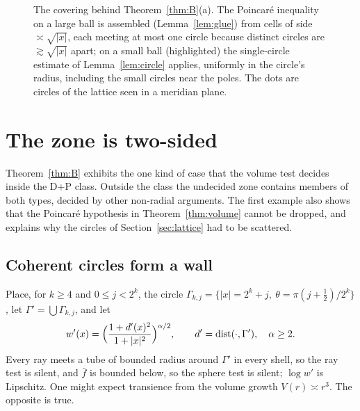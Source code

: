 \documentclass[11pt]{amsart}
\newcommand{\abs}[1]{\lvert #1\rvert}
\newcommand{\fbar}{\bar f}
\DeclareMathOperator{\dist}{dist}
\theoremstyle{plain}
\theoremstyle{definition}
\theoremstyle{remark}
\begin{document}
\begin{figure}[t]
\centering
{}
\caption{The covering behind Theorem~\ref{thm:B}(a). The Poincar\'e inequality on
a large ball is assembled (Lemma~\ref{lem:glue}) from cells of side
$\asymp\sqrt{\abs x}$, each meeting at most one circle because distinct circles
are $\gtrsim\sqrt{\abs x}$ apart; on a small ball (highlighted) the single-circle
estimate of Lemma~\ref{lem:circle} applies, uniformly in the circle's radius,
including the small circles near the poles. The dots are circles of the lattice
seen in a meridian plane.}
\label{fig:covering}
\end{figure}

\section{The zone is two-sided}\label{sec:zone}

Theorem~\ref{thm:B} exhibits the one kind of case that the volume test decides
inside the D+P class. Outside the class the undecided zone contains members of
both types, decided by other non-radial arguments. The first example also shows
that the Poincar\'e hypothesis in Theorem~\ref{thm:volume} cannot be dropped,
and explains why the circles of Section~\ref{sec:lattice} had to be scattered.

\subsection{Coherent circles form a wall}\label{sec:wall}
Place, for $k\ge4$ and $0\le j<2^k$, the circle
$\Gamma_{k,j}=\{\abs x=2^k+j,\ \theta=\pi(j+\frac12)/2^k\}$, let
$\Gamma'=\bigcup\Gamma_{k,j}$, and let
\begin{equation}\label{eq:wall}
w'(x)=\Bigl(\frac{1+d'(x)^2}{1+\abs x^2}\Bigr)^{\alpha/2},\qquad
d'=\dist(\cdot,\Gamma'),\quad\alpha\ge2 .
\end{equation}
Every ray meets a tube of bounded radius around $\Gamma'$ in every shell, so the ray test is
silent, and $\fbar$ is bounded below, so the sphere test is silent; $\log w'$ is
Lipschitz. One might expect transience from the volume growth
$V(r)\asymp r^3$. The opposite is true.
\end{document}
